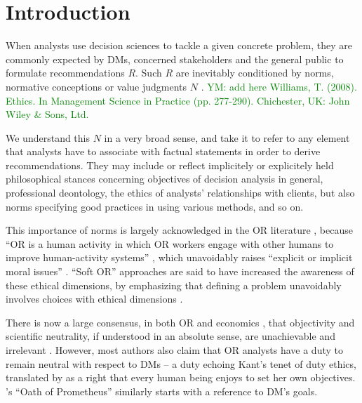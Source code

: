 \documentclass[preprint, french, english, 11pt, authoryear]{elsarticle}%
\newcommand{\ac}[1]{#1}
\newcommand{\acp}[1]{#1s}
\newcommand{\commentYM}[1]{\textcolor{green}{YM: #1}}
\begin{document}
\maketitle

\section{Introduction}
When analysts use decision sciences to tackle a given concrete problem, they are commonly expected by \acp{DM}, concerned stakeholders and the general public to formulate recommendations $R$. 
Such $R$ are inevitably conditioned by norms, normative conceptions or value judgments $N$ \citep{funtowicz_science_1993,brans_ethics_2002,mingers_ethics_2011}. 
\commentYM{add here Williams, T. (2008). Ethics. In Management Science in Practice (pp. 277-290). Chichester, UK: John Wiley \& Sons, Ltd.}
\begin{changebar}We understand this $N$ in a very broad sense, and take it to refer to any element that analysts have to associate with factual statements in order to derive recommendations. 
They may include or reflect implicitely or explicitely held philosophical stances concerning objectives of decision analysis in general, professional deontology, the ethics of analysts' relationships with clients, but also norms specifying good practices in using various methods, and so on.\end{changebar}

\begin{changebar}
This importance of norms is largely acknowledged in the \ac{OR} literature \citep{churchman_operations_1970,taket_undercover_1994,brans_ethics_2007,picavet_opportunities_2009}, 
because ``\ac{OR} is a human activity in which \ac{OR} workers engage with other humans to improve human-activity systems'' \citep{ormerod_operational_2013}, which unavoidably raises ``explicit or implicit moral issues'' \citep{diekmann_moral_2013}.
``Soft \ac{OR}'' approaches are said to have increased the awareness of these ethical dimensions, by emphasizing that defining a problem unavoidably involves choices with ethical dimensions \citep{ulrich_beyond_2003}.\end{changebar}

\begin{changebar}
There is now a large consensus, in both \ac{OR} and economics \citep{buchanan_positive_1959, sen_nature_1967, dwyer_scientific_1985, heath_value_1994, sen_rationality_2004, mongin_value_2006, sen_idea_2009, baujard_value_2013},
that objectivity and scientific neutrality, if understood in an absolute sense, are unachievable and irrelevant \citep{le_menestrel_ethics_2004,reisach_creation_2016}. However, most authors also claim that \ac{OR} analysts have a duty to remain neutral with respect to \acp{DM} 
-- a duty echoing Kant’s tenet of duty ethics, translated by \citet{reisach_creation_2016} as a right that every human being enjoys to set her own objectives.
\citet{gass_ethical_2009}'s ``Oath of Prometheus'' similarly starts with a reference to \ac{DM}'s goals.\end{changebar}
\end{document}
